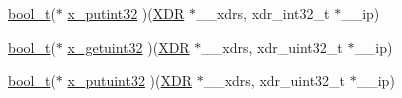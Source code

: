 \begin{DoxyCompactItemize}
\item 
\hyperlink{include_2gmx__system__xdr_8h_a812d16e5494522586b3784e55d479912}{bool\-\_\-t}($\ast$ \hyperlink{structXDR_1_1xdr__ops_a9aca04974e89778f2cdd8cb0c3a09605}{x\-\_\-putint32} )(\hyperlink{structXDR}{\-X\-D\-R} $\ast$\-\_\-\-\_\-xdrs, xdr\-\_\-int32\-\_\-t $\ast$\-\_\-\-\_\-ip)
\item 
\hyperlink{include_2gmx__system__xdr_8h_a812d16e5494522586b3784e55d479912}{bool\-\_\-t}($\ast$ \hyperlink{structXDR_1_1xdr__ops_a6277de4bae4c953469d7f0530dab8c1a}{x\-\_\-getuint32} )(\hyperlink{structXDR}{\-X\-D\-R} $\ast$\-\_\-\-\_\-xdrs, xdr\-\_\-uint32\-\_\-t $\ast$\-\_\-\-\_\-ip)
\item 
\hyperlink{include_2gmx__system__xdr_8h_a812d16e5494522586b3784e55d479912}{bool\-\_\-t}($\ast$ \hyperlink{structXDR_1_1xdr__ops_a5217c37546df602c7707342faa2e8eef}{x\-\_\-putuint32} )(\hyperlink{structXDR}{\-X\-D\-R} $\ast$\-\_\-\-\_\-xdrs, xdr\-\_\-uint32\-\_\-t $\ast$\-\_\-\-\_\-ip)
\end{DoxyCompactItemize}



